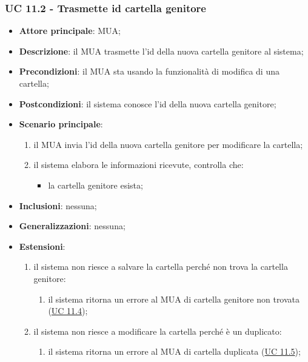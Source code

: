 \subsubsection{UC 11.2 - Trasmette id cartella genitore} \label{sec:UC11.2}
\begin{itemize}
    \item \textbf{Attore principale}: MUA;
    \item \textbf{Descrizione}: il MUA trasmette l'id della nuova cartella genitore al sistema;
    \item \textbf{Precondizioni}: il MUA sta usando la funzionalità di modifica di una cartella;
    \item \textbf{Postcondizioni}: il sistema conosce l'id della nuova cartella genitore;
    \item \textbf{Scenario principale}:
        \begin{enumerate}
            \item il MUA invia l'id della nuova cartella genitore per modificare la cartella;
            \item il sistema elabora le informazioni ricevute, controlla che:
            \begin{itemize}
                \item la cartella genitore esista;
            \end{itemize}
        \end{enumerate}
    \item \textbf{Inclusioni}: nessuna;
    \item \textbf{Generalizzazioni}: nessuna;
    \item \textbf{Estensioni}:
        \begin{enumerate}[label=\alph*.]
            \item il sistema non riesce a salvare la cartella perché non trova la cartella genitore:
            \begin{enumerate}[label=\arabic*.]
                \item il sistema ritorna un errore al MUA di cartella genitore non trovata (\hyperref[sec:UC11.4]{UC 11.4});
            \end{enumerate}
            \item il sistema non riesce a modificare la cartella perché è un duplicato:
            \begin{enumerate}[label=\arabic*.]
                \item il sistema ritorna un errore al MUA di cartella duplicata (\hyperref[sec:UC11.5]{UC 11.5});
            \end{enumerate}
        \end{enumerate}
\end{itemize}



